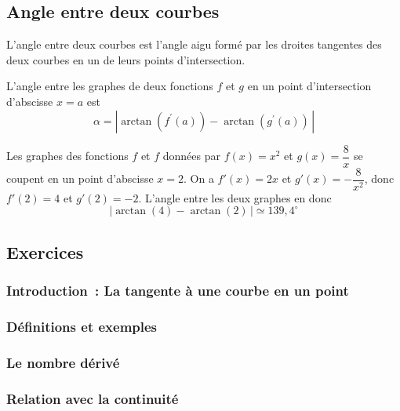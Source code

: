 \documentclass[a4paper,12pt]{article}
\begin{document}
\subsection{Angle entre deux courbes}
\begin{definition}
	\tcblower
	L'angle entre deux courbes est l'angle aigu formé par les droites tangentes des deux courbes en un de leurs points d'intersection.
\end{definition}
\begin{formule}
	\tcblower
	L'angle entre les graphes de deux fonctions $f$ et $g$ en un point d'intersection d'abscisse $x=a$ est 
	\[\alpha=|\arctan(f^\prime(a))-\arctan(g^\prime(a))\,|\]
\end{formule}
\begin{exemple}
	\tcblower
	Les graphes des fonctions $f$ et $f$ données par $f(x)=x^2$ et $g(x)=\dfrac{8}{x}$ se coupent en un point d'abscisse $x=2$. On a $f'(x)=2x$ et $g'(x)=-\dfrac{8}{x^2}$, donc $f'(2)=4$ et $g'(2)=-2$. L'angle entre les deux graphes en donc 
	\[|\arctan(4)-\arctan(2)\,|\simeq 139,4^\circ\]
\end{exemple}


\subsection{Exercices}
\subsubsection{Introduction~: La tangente à une courbe en un point}
\subsubsection{Définitions et exemples}


\subsubsection{Le nombre dérivé}

\subsubsection{Relation avec la continuité}
\end{document}
